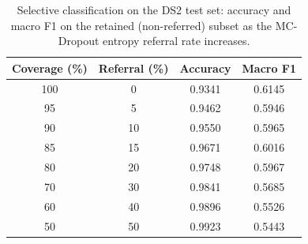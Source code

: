 \begin{table}[htbp]
\caption{Selective classification on the DS2 test set: accuracy and macro F1 on the retained (non-referred) subset as the MC-Dropout entropy referral rate increases.}
\label{tab:selective}
\centering
\begin{tabular}{@{}cccc@{}}
\toprule
\textbf{Coverage (\%)} & \textbf{Referral (\%)} & \textbf{Accuracy} & \textbf{Macro F1} \\
\midrule
100 & 0 & 0.9341 & 0.6145 \\
95 & 5 & 0.9462 & 0.5946 \\
90 & 10 & 0.9550 & 0.5965 \\
85 & 15 & 0.9671 & 0.6016 \\
80 & 20 & 0.9748 & 0.5967 \\
70 & 30 & 0.9841 & 0.5685 \\
60 & 40 & 0.9896 & 0.5526 \\
50 & 50 & 0.9923 & 0.5443 \\
\bottomrule
\end{tabular}
\end{table}